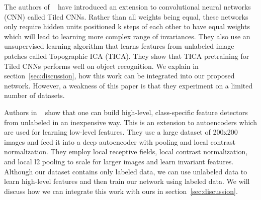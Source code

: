 \documentclass{article} %
\begin{document}
The authors of ~\cite{nipsandrewng} have introduced an extension to convolutional neural networks (CNN) called Tiled CNNs. Rather than all weights being equal, these networks only require hidden units positioned k steps of each other to have equal weights which will lead to learning more complex range of invariances. 
They also use an unsupervised learning algorithm that learns features from unlabeled image patches called Topographic ICA (TICA). They show that TICA pretraining for Tiled CNNs performs well on object recognition. We explain in section~\ref{sec:discussion}, how this work can be integrated into our proposed network. However, a weakness of this paper is that they experiment on a limited number of datasets.

Authors in ~\cite{icml_unsupervised} show that one can build high-level, class-specific feature detectors from unlabeled in an inexpensive way. This is an extension to autoencoders which are used for learning low-level features. They use a large dataset of 200x200 images and feed it into a deep autoencoder with pooling and local contrast normalization. They employ local receptive fields,  local contrast normalization, and local l2 pooling to scale for larger images and learn invariant features. Although our dataset contains only labeled data, we can use unlabeled data to learn high-level features and then train our network using labeled data. We will discuss how we can integrate this work with ours in section~\ref{sec:discussion}.
\end{document}
